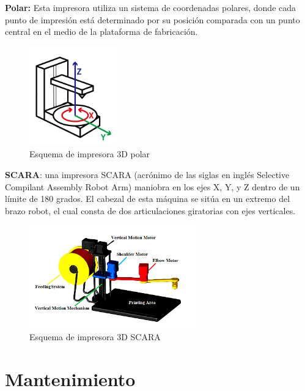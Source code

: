 \begin{description}
\item \textbf{Polar:} Esta impresora utiliza un sistema de coordenadas polares, donde cada punto de impresión está determinado por su posición comparada con un punto central en el medio de la plataforma de fabricación.

\begin{figure}[H]
\centering
\includegraphics[scale=0.8]{images/polar.png}
\caption{Esquema de impresora 3D polar \parencite{takamori2018}}
\end{figure}

\item \textbf{SCARA}: una impresora SCARA (acrónimo de las siglas en inglés Selective Compilant Assembly Robot Arm) maniobra en los ejes X, Y, y Z dentro de un límite de 180 grados. El cabezal de esta máquina se sitúa en un extremo del brazo robot, el cual consta de dos articulaciones giratorias con ejes verticales.

\begin{figure}[H]
\centering
\includegraphics[scale=0.8]{images/scara.png}
\caption{Esquema de impresora 3D SCARA \parencite{saygin2016}}
\end{figure}



\end{description}

\pagebreak
\section{Mantenimiento}

